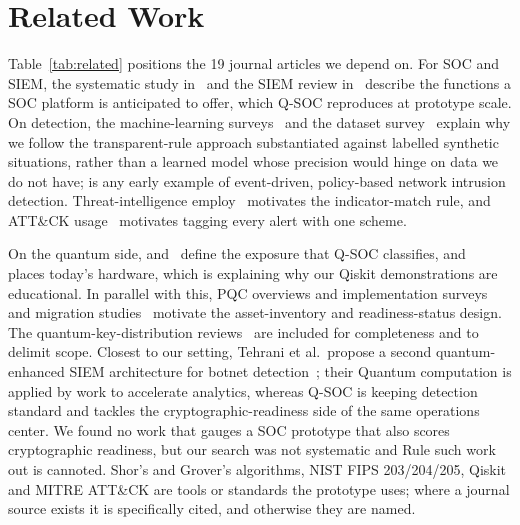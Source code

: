 \documentclass[conference]{IEEEtran}
\begin{document}
\section{Related Work}\label{sec:related}
Table~\ref{tab:related} positions the 19 journal articles we depend on. For SOC and SIEM, the systematic study in~\cite{vielberth2020} and the SIEM review in~\cite{gonzalez2021} describe the functions a SOC platform is anticipated to offer, which Q-SOC reproduces at prototype scale. On detection, the machine-learning surveys~\cite{buczak2016,khraisat2019} and the dataset survey~\cite{ring2019} explain why we follow the transparent-rule approach substantiated against labelled synthetic situations, rather than a learned model whose precision would hinge on data we do not have; \cite{paxson1999} is any early example of event-driven, policy-based network intrusion detection. Threat-intelligence employ~\cite{tounsi2018} motivates the indicator-match rule, and ATT\&CK usage~\cite{georgiadou2021} motivates tagging every alert with one scheme.

On the quantum side, \cite{shor1997} and~\cite{gidney2021} define the exposure that Q-SOC classifies, and~\cite{preskill2018} places today's hardware, which is explaining why our Qiskit demonstrations are educational. In parallel with this, PQC overviews and implementation surveys~\cite{bernstein2017,nejatollahi2019} and migration studies~\cite{joseph2022,baseri2026} motivate the asset-inventory and readiness-status design. The quantum-key-distribution reviews~\cite{gisin2002,pirandola2020} are included for completeness and to delimit scope. Closest to our setting, Tehrani et al.\ propose a second quantum-enhanced SIEM architecture for botnet detection~\cite{tehrani2024}; their Quantum computation is applied by work to accelerate analytics, whereas Q-SOC is keeping detection standard and tackles the cryptographic-readiness side of the same operations center. We found no work that gauges a SOC prototype that also scores cryptographic readiness, but our search was not systematic and Rule such work out is cannoted. Shor's and Grover's algorithms, NIST FIPS 203/204/205, Qiskit and MITRE ATT\&CK are tools or standards the prototype uses; where a journal source exists it is specifically cited, and otherwise they are named.
\end{document}
